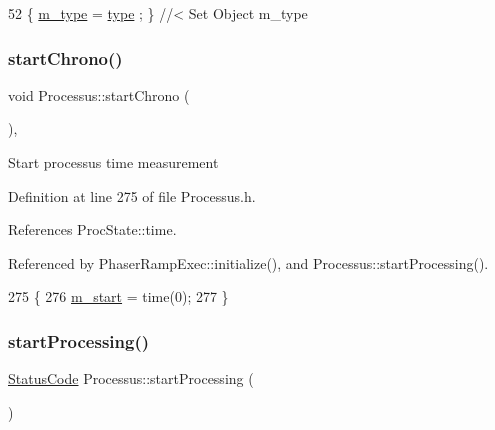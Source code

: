 \begin{DoxyCode}
52 \{ \hyperlink{classObject_a457a600fe8c00eb1034374f75110a78c}{m\_type}  = \hyperlink{classObject_a84f99f70f144a83e1582d1d0f84e4e62}{type}  ; \} \textcolor{comment}{//< Set Object m\_type}
\end{DoxyCode}
\mbox{\label{classProcessus_a5e4d34b86241fa0756e07375a14ff4b2}} 
\subsubsection{\texorpdfstring{start\+Chrono()}{startChrono()}}
{\footnotesize\ttfamily void Processus\+::start\+Chrono (\begin{DoxyParamCaption}{ }\end{DoxyParamCaption})\hspace{0.3cm}{\ttfamily [inline]}, {\ttfamily [inherited]}}

Start processus time measurement 

Definition at line 275 of file Processus.\+h.



References Proc\+State\+::time.



Referenced by Phaser\+Ramp\+Exec\+::initialize(), and Processus\+::start\+Processing().


\begin{DoxyCode}
275                     \{
276     \hyperlink{classProcessus_a8ec00b2e12c5beada932610f30218e93}{m\_start} = time(0);
277   \}
\end{DoxyCode}
\mbox{\label{classProcessus_a09319bde9bed93e290f69b4e04585543}} 
\subsubsection{\texorpdfstring{start\+Processing()}{startProcessing()}}
{\footnotesize\ttfamily \hyperlink{classStatusCode}{Status\+Code} Processus\+::start\+Processing (\begin{DoxyParamCaption}{ }\end{DoxyParamCaption})\hspace{0.3cm}{\ttfamily [inherited]}}

